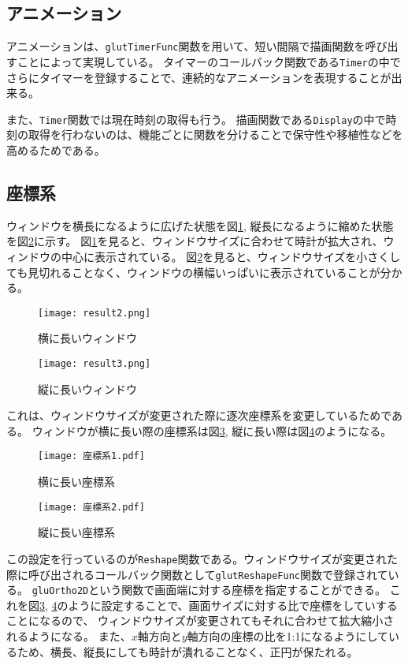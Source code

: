 \documentclass[a4j,titlepage]{jsarticle}
\begin{document}
\subsection{アニメーション}
アニメーションは、\texttt{glutTimerFunc}関数を用いて、短い間隔で描画関数を呼び出すことによって実現している。
タイマーのコールバック関数である\texttt{Timer}の中でさらにタイマーを登録することで、連続的なアニメーションを表現することが出来る。

また、\texttt{Timer}関数では現在時刻の取得も行う。
描画関数である\texttt{Display}の中で時刻の取得を行わないのは、機能ごとに関数を分けることで保守性や移植性などを高めるためである。

\subsection{座標系}
ウィンドウを横長になるように広げた状態を図\ref{fig:res2}, 縦長になるように縮めた状態を図\ref{fig:res3}に示す。
図\ref{fig:res2}を見ると、ウィンドウサイズに合わせて時計が拡大され、ウィンドウの中心に表示されている。
図\ref{fig:res3}を見ると、ウィンドウサイズを小さくしても見切れることなく、ウィンドウの横幅いっぱいに表示されていることが分かる。

\begin{figure}[H]
  \centering
  \texttt{[image: result2.png]}
  \caption{横に長いウィンドウ}
  \label{fig:res2}
\end{figure}

\begin{figure}[H]
  \centering
  \texttt{[image: result3.png]}
  \caption{縦に長いウィンドウ}
  \label{fig:res3}
\end{figure}

これは、ウィンドウサイズが変更された際に逐次座標系を変更しているためである。
ウィンドウが横に長い際の座標系は図\ref{fig:frame1}, 縦に長い際は図\ref{fig:frame2}のようになる。

\begin{figure}[H]
  \centering
  \texttt{[image: 座標系1.pdf]}
  \caption{横に長い座標系}
  \label{fig:frame1}
\end{figure}

\begin{figure}[H]
  \centering
  \texttt{[image: 座標系2.pdf]}
  \caption{縦に長い座標系}
  \label{fig:frame2}
\end{figure}

この設定を行っているのが\texttt{Reshape}関数である。ウィンドウサイズが変更された際に呼び出されるコールバック関数として\texttt{glutReshapeFunc}関数で登録されている。
\texttt{gluOrtho2D}という関数で画面端に対する座標を指定することができる。
これを図\ref{fig:frame1}, \ref{fig:frame2}のように設定することで、画面サイズに対する比で座標をしていすることになるので、
ウィンドウサイズが変更されてもそれに合わせて拡大縮小されるようになる。
また、$x$軸方向と$y$軸方向の座標の比を1:1になるようにしているため、横長、縦長にしても時計が潰れることなく、正円が保たれる。
\end{document}
